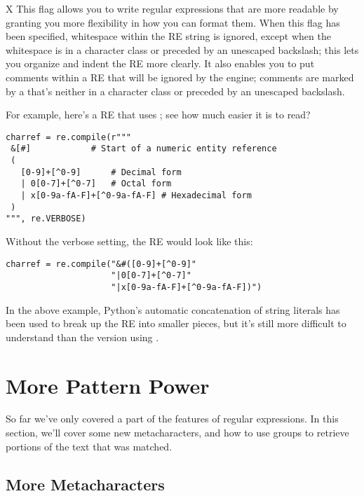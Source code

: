 \documentclass{howto}
\begin{document}
\begin{datadesc}{X}
 This flag allows you to write regular expressions
that are more readable by granting you more flexibility in how you can
format them.  When this flag has been specified, whitespace within the
RE string is ignored, except when the whitespace is in a character
class or preceded by an unescaped backslash; this lets you organize
and indent the RE more clearly.  It also enables you to put comments
within a RE that will be ignored by the engine; comments are marked by
a \character{\#} that's neither in a character class or preceded by an
unescaped backslash.

For example, here's a RE that uses ; see how
much easier it is to read?

\begin{verbatim}
charref = re.compile(r"""
 &[#]		     # Start of a numeric entity reference
 (
   [0-9]+[^0-9]      # Decimal form
   | 0[0-7]+[^0-7]   # Octal form
   | x[0-9a-fA-F]+[^0-9a-fA-F] # Hexadecimal form
 )
""", re.VERBOSE)
\end{verbatim}

Without the verbose setting, the RE would look like this:
\begin{verbatim}
charref = re.compile("&#([0-9]+[^0-9]"
                     "|0[0-7]+[^0-7]"
                     "|x[0-9a-fA-F]+[^0-9a-fA-F])")
\end{verbatim}

In the above example, Python's automatic concatenation of string
literals has been used to break up the RE into smaller pieces, but
it's still more difficult to understand than the version using
.

\end{datadesc}

\section{More Pattern Power}

So far we've only covered a part of the features of regular
expressions.  In this section, we'll cover some new metacharacters,
and how to use groups to retrieve portions of the text that was matched.

\subsection{More Metacharacters\label{more-metacharacters}}
\end{document}
